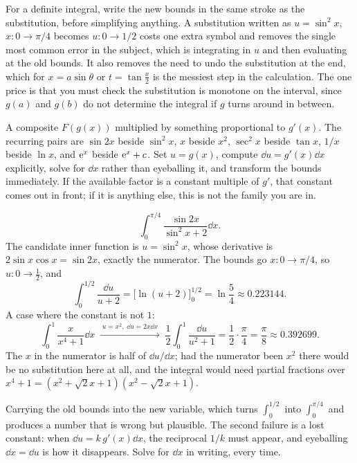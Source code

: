 \begin{keynote}
For a definite integral, write the new bounds in the same stroke as the substitution, before simplifying anything. A substitution written as $u=\sin^2x$, $x:0\to\pi/4$ becomes $u:0\to1/2$ costs one extra symbol and removes the single most common error in the subject, which is integrating in $u$ and then evaluating at the old bounds. It also removes the need to undo the substitution at the end, which for $x=a\sin\theta$ or $t=\tan\tfrac x2$ is the messiest step in the calculation. The one price is that you must check the substitution is monotone on the interval, since $g(a)$ and $g(b)$ do not determine the integral if $g$ turns around in between.
\end{keynote}

\cue A composite $F(g(x))$ multiplied by something proportional to $g'(x)$. The recurring pairs are $\sin2x$ beside $\sin^2x$, $x$ beside $x^2$, $\sec^2x$ beside $\tan x$, $1/x$ beside $\ln x$, and $\mathrm{e}^x$ beside $\mathrm{e}^x+c$.
\method Set $u=g(x)$, compute $\dd u=g'(x)\dd x$ explicitly, solve for $\dd x$ rather than eyeballing it, and transform the bounds immediately. If the available factor is a constant multiple of $g'$, that constant comes out in front; if it is anything else, this is not the family you are in.

\begin{worked}
\[
\int_0^{\pi/4}\frac{\sin2x}{\sin^2x+2}\dd x .
\]
The candidate inner function is $u=\sin^2x$, whose derivative is $2\sin x\cos x=\sin2x$, exactly the numerator. The bounds go $x:0\to\pi/4$, so $u:0\to\tfrac12$, and
\[
\int_0^{1/2}\frac{\dd u}{u+2}=\bigl[\ln(u+2)\bigr]_0^{1/2}=\ln\frac{5}{4}\approx0.223144 .
\]
A case where the constant is not $1$:
\[
\int_0^1\frac{x}{x^4+1}\dd x\;\xrightarrow{\;u=x^2,\;\dd u=2x\dd x\;}\;\frac12\int_0^1\frac{\dd u}{u^2+1}=\frac12\cdot\frac{\pi}{4}=\frac{\pi}{8}\approx0.392699 .
\]
The $x$ in the numerator is half of $\dd u/\dd x$; had the numerator been $x^2$ there would be no substitution here at all, and the integral would need partial fractions over $x^4+1=(x^2+\sqrt2x+1)(x^2-\sqrt2x+1)$.
\end{worked}

\begin{trap}
Carrying the old bounds into the new variable, which turns $\int_0^{1/2}$ into $\int_0^{\pi/4}$ and produces a number that is wrong but plausible. The second failure is a lost constant: when $\dd u=k\,g'(x)\dd x$, the reciprocal $1/k$ must appear, and eyeballing $\dd x=\dd u$ is how it disappears. Solve for $\dd x$ in writing, every time.
\end{trap}

